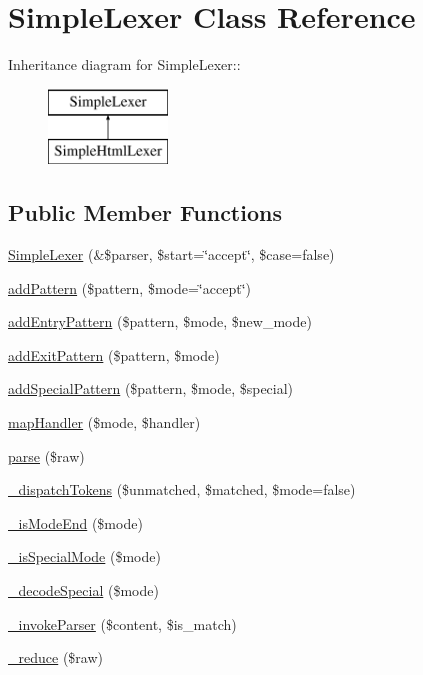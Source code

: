 \hypertarget{class_simple_lexer}{
\section{SimpleLexer Class Reference}
\label{class_simple_lexer}
}
Inheritance diagram for SimpleLexer::\begin{figure}[H]
\begin{center}
\leavevmode
\includegraphics[height=2cm]{class_simple_lexer}
\end{center}
\end{figure}
\subsection*{Public Member Functions}
\begin{DoxyCompactItemize}
\item 
\hyperlink{class_simple_lexer_ae2bb586444d1d4ce1ef521b9f6b2bc75}{SimpleLexer} (\&\$parser, \$start=\char`\"{}accept\char`\"{}, \$case=false)
\item 
\hyperlink{class_simple_lexer_af0ef334972904054720c4ededafb9a24}{addPattern} (\$pattern, \$mode=\char`\"{}accept\char`\"{})
\item 
\hyperlink{class_simple_lexer_a4fd4c1124a0c5f7b16548351779deab7}{addEntryPattern} (\$pattern, \$mode, \$new\_\-mode)
\item 
\hyperlink{class_simple_lexer_a1cf1b9bc0c1d4b8b3dd465e31a6e1a15}{addExitPattern} (\$pattern, \$mode)
\item 
\hyperlink{class_simple_lexer_a59d5052dc25de99c53042847e8214c4f}{addSpecialPattern} (\$pattern, \$mode, \$special)
\item 
\hyperlink{class_simple_lexer_ad84116197560273d3fd02bd5e74dfe81}{mapHandler} (\$mode, \$handler)
\item 
\hyperlink{class_simple_lexer_afeceabe5e976b20b1e14fed952d79107}{parse} (\$raw)
\item 
\hyperlink{class_simple_lexer_a6dd073c1e7bbc77a4aafd9ac23bba172}{\_\-dispatchTokens} (\$unmatched, \$matched, \$mode=false)
\item 
\hyperlink{class_simple_lexer_a681e5891f263a352e8502f8196b541fc}{\_\-isModeEnd} (\$mode)
\item 
\hyperlink{class_simple_lexer_a419cf4b1b734f60af7a867f352decbd1}{\_\-isSpecialMode} (\$mode)
\item 
\hyperlink{class_simple_lexer_a64f7cbf4238a99aaa177d64dd3614b82}{\_\-decodeSpecial} (\$mode)
\item 
\hyperlink{class_simple_lexer_a287ef4470e221f5b348fbda97a88a70f}{\_\-invokeParser} (\$content, \$is\_\-match)
\item 
\hyperlink{class_simple_lexer_a7d11e9e2b45a5b585b57f82e760b5454}{\_\-reduce} (\$raw)
\end{DoxyCompactItemize}
